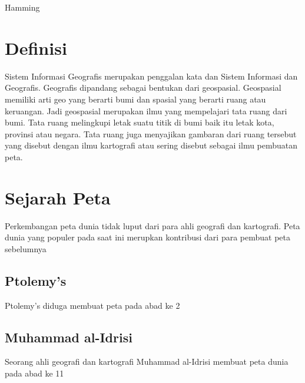 {Hamming}

\section{Definisi}
Sistem Informasi Geografis merupakan penggalan kata dan Sistem Informasi dan Geografis. Geografis dipandang sebagai bentukan dari geospasial.
Geospasial memiliki arti geo yang berarti bumi dan spasial yang berarti ruang atau keruangan. Jadi geospasial merupakan ilmu yang mempelajari 
tata ruang dari bumi. Tata ruang melingkupi letak suatu titik di bumi baik itu letak kota, provinsi atau negara. Tata ruang juga menyajikan gambaran dari ruang tersebut yang disebut dengan ilmu kartografi atau sering disebut sebagai ilmu pembuatan peta\cite{IEEEhowto:IEEEtranpage}.

\section{Sejarah Peta}
Perkembangan peta dunia tidak luput dari para ahli geografi dan kartografi. Peta dunia yang populer pada saat ini merupkan kontribusi dari para 
pembuat peta sebelumnya

\subsection{Ptolemy's}
Ptolemy's diduga membuat peta pada abad ke 2


\subsection{Muhammad al-Idrisi}
Seorang ahli geografi dan kartografi Muhammad al-Idrisi membuat peta dunia pada abad ke 11

